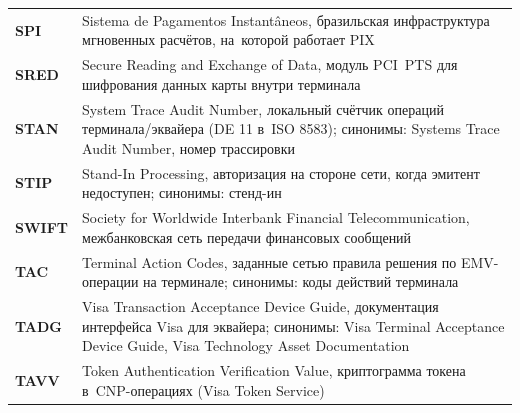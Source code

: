\begin{longtable}{@{}p{4.5em}p{\dimexpr\linewidth-4.5em-2\tabcolsep\relax}@{}}
  \textbf{SPI}               & Sistema de Pagamentos Instantâneos, бразильская инфраструктура мгновенных расчётов, на~которой работает PIX                                                                                                                                                                                                       \\
  \textbf{SRED}              & Secure Reading and Exchange of Data, модуль PCI~PTS для шифрования данных карты внутри терминала                                                                                                                                                                                                 \\
  \textbf{STAN}              & System Trace Audit Number, локальный счётчик операций терминала/эквайера (DE 11 в~ISO 8583); синонимы: Systems Trace Audit Number, номер трассировки                                                                                                                                              \\
  \textbf{STIP}              & Stand-In Processing, авторизация на стороне сети, когда эмитент недоступен; синонимы: стенд-ин                                                                                                                                                                                                   \\
  \textbf{SWIFT}             & Society for Worldwide Interbank Financial Telecommunication, межбанковская сеть передачи финансовых сообщений                                                                                                                                                                                    \\
  \textbf{TAC}               & Terminal Action Codes, заданные сетью правила решения по EMV-операции на терминале; синонимы: коды действий терминала                                                                                                                                                                            \\
  \textbf{TADG}              & Visa Transaction Acceptance Device Guide, документация интерфейса Visa для эквайера; синонимы: Visa Terminal Acceptance Device Guide, Visa Technology Asset Documentation                                                                                                                        \\
  \textbf{TAVV}              & Token Authentication Verification Value, криптограмма токена в~CNP-операциях (Visa Token Service)                                                                                                                                                                                                \\

\end{longtable}
